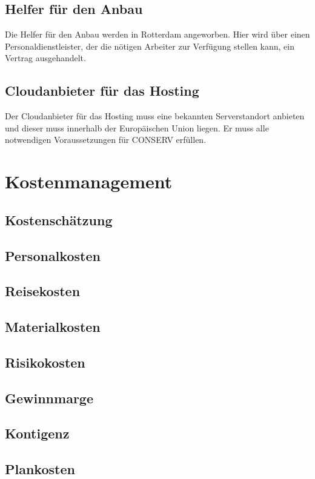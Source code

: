 \subsection{Helfer für den Anbau}
Die Helfer für den Anbau werden in Rotterdam angeworben. Hier wird über einen Personaldienstleister, der die nötigen Arbeiter zur Verfügung stellen kann, ein Vertrag ausgehandelt.

\subsection{Cloudanbieter für das Hosting}
Der Cloudanbieter für das Hosting muss eine bekannten Serverstandort anbieten und dieser muss innerhalb der Europäischen Union liegen. Er muss alle notwendigen Voraussetzungen für CONSERV erfüllen.


\section{Kostenmanagement}

\subsection{Kostenschätzung}
\subsection{Personalkosten} %
\subsection{Reisekosten}
% 
\subsection{Materialkosten}
\subsection{Risikokosten}
\subsection{Gewinnmarge}

\subsection{Kontigenz} %

\subsection{Plankosten}






